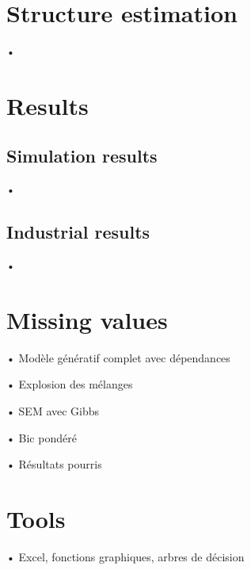 \documentclass[11pt]{beamer}
\begin{document}
\section{Structure estimation}
	\begin{frame}{•}
	
	\end{frame}

\section{Results}
	\subsection{Simulation results}
		\begin{frame}{•}
		
		\end{frame}
	\subsection{Industrial results}
		\begin{frame}{•}
		
		\end{frame}
\section{Missing values}
	\begin{frame}{•}
	Modèle génératif complet avec dépendances
	\end{frame}
	\begin{frame}{•}
	Explosion des mélanges 
	\end{frame}
	\begin{frame}{•}
	SEM avec Gibbs 
	\end{frame}
	\begin{frame}{•}
	Bic pondéré 
	\end{frame}
	\begin{frame}{•}
	Résultats pourris 
	\end{frame}
\section{Tools}
	\begin{frame}{•}
		Excel, fonctions graphiques, arbres de décision
	\end{frame}

\begin{frame}

%

\end{frame}
\end{document}
